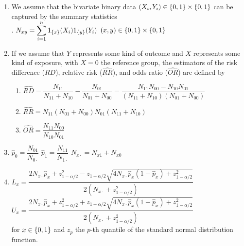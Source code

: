 \begin{enumerate}
    \item We assume that the bivariate binary data $(X_i , Y_i ) \in \left\{0, 1\right\} \times \left\{0, 1\right\}$ can be captured by the summary statistics
    \hfill \cite{statistics/book/Statistics-for-Data-Scientists/Maurits-Kaptein}
    \\
    .\hfill
    $ N_{x y} = \displaystyle\sum^n_{i=1} 1_{\left\{x\right\}}(X_i )1_{\left\{y\right\}}(Y_i ) $
    \hfill 
    $ (x , y ) \in \left\{0, 1\right\} \times \left\{0, 1\right\} $
    \hfill \cite{statistics/book/Statistics-for-Data-Scientists/Maurits-Kaptein}

    \item If we assume that $Y$ represents some kind of outcome and $X$ represents some kind of exposure, with $X = 0$ the reference group, the estimators of the risk difference ($\hat{R D}$), relative risk ($\hat{R R}$), and odds ratio ($\hat{O R}$) are defined by
    \hfill \cite{statistics/book/Statistics-for-Data-Scientists/Maurits-Kaptein}
    \begin{enumerate}
        \item 
        $ 
            \hat{R D} 
            = \dfrac{N_{11}}{N_{11} + N_{10}} - \dfrac{N_{01}}{N_{01} + N_{00}} 
            = \dfrac{N_{11} N_{00} - N_{10} N_{01}}{(N_{11} + N_{10})(N_{01} + N_{00}) }
        $
        \hfill \cite{statistics/book/Statistics-for-Data-Scientists/Maurits-Kaptein}

        \item $\hat{R R} = {N_{11}(N_{01} + N_{00})} {N_{01}(N_{11} + N_{10})}$
        \hfill \cite{statistics/book/Statistics-for-Data-Scientists/Maurits-Kaptein}

        \item $\hat{O R} = \dfrac{N_{11} N_{00}}{N_{10} N_{01}}$
        \hfill \cite{statistics/book/Statistics-for-Data-Scientists/Maurits-Kaptein}
    \end{enumerate}

    \item 
    $\hat{p}_0 = \dfrac{N_{01}}{N_{0\cdot}}$
    \hfill
    $\hat{p}_1 = \dfrac{N_{11}}{N_{1\cdot}}$
    \hfill
    $N_{x\cdot} = N_{x1} + N_{ x0}$
    \hfill \cite{statistics/book/Statistics-for-Data-Scientists/Maurits-Kaptein}

    \item 
    $
        L_x
        = \dfrac{
            2N_{x\cdot } \hat{p}_x + z^2_{1-\alpha/2} 
            - z_{1-\alpha/2} \sqrt{4N_{x\cdot } \hat{p}_x (1 - \hat{p}_x ) + z^2_{1-\alpha/2}}
        }{
            2(N_{x\cdot } + z^2_{1-\alpha/2}) 
        }
    $
    \\[0.4cm]
    $
        U_x
        = \dfrac{
            2N_{x\cdot } \hat{p}_x + z^2_{1-\alpha/2} 
            + z_{1-\alpha/2} \sqrt{4N_{x\cdot } \hat{p}_x (1 - \hat{p}_x ) + z^2_{1-\alpha/2}}
        }{
            2(N_{x\cdot } + z^2_{1-\alpha/2}) 
        }
    $
    \hfill \cite{statistics/book/Statistics-for-Data-Scientists/Maurits-Kaptein}
    \\[0.3cm]
    for $x \in \left\{0, 1\right\}$ and $z_p$ the $p$-th quantile of the standard normal distribution function.
    \hfill \cite{statistics/book/Statistics-for-Data-Scientists/Maurits-Kaptein}


\end{enumerate}
